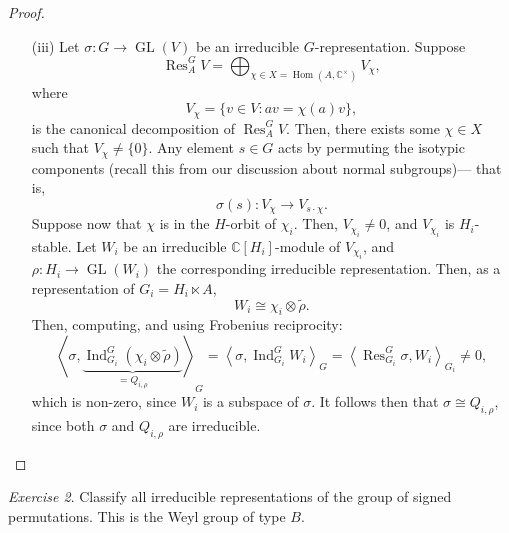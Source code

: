 \documentclass[a4paper]{report}
\theoremstyle{definition}
\theoremstyle{remark}
\theoremstyle{proposition}
\theoremstyle{conjecture}
\theoremstyle{lemma}
\theoremstyle{corollary}
\theoremstyle{exercise}
\newtheorem{exercise}{Exercise}
\theoremstyle{example}
\newcommand{\C}{\mathbb{C}}
\newcommand{\on}{\operatorname}
\begin{document}
\begin{proof}
\begin{itemize}
$${        $a\in A$}\rbrace.$$
        We claim that $V_i$ is $H_i$-stable. Indeed,
        $$Q_{i,\rho}(a)h_i\cdot v = Q_{i,\rho}(a)\theta_{i,\rho}(h_i)v = Q_{i,\rho}(h_i) \theta_{i,\rho}(h_i^{-1}ah_i)v = Q_{i,\rho}(h_i) \underbrace{\chi_i(h_i^{-1}ah_i)}_{=h_i\cdot \chi_i(a) =\chi_i(a)}v = \chi_i(a) h_iv.$$
        It follows then that $V_i \cong \rho$ as $H_i$-representations,
        and it thus follows that $Q_{i,\rho}$ determines $\rho$ --- 
        this is because $\chi_i\otimes \widetilde{\rho} \cong V_i$ as 
        $H_i$-representations.
        \begin{exercise}
            Prove this isomorphism.
        \end{exercise}
        \begin{proof}

        \end{proof}
    \item[(iii)] Let $\sigma : G \to \on{GL}(V)$ be an irreducible 
        $G$-representation. Suppose 
        $$\on{Res}^G_A V = \bigoplus_{\chi \in X = \on{Hom}(A,\C^\times)}V_\chi,$$
        where $$V_\chi = \lbrace v\in V : av = \chi(a) v\rbrace,$$
        is the canonical decomposition of $\on{Res}^G_AV$.
        Then, there exists some $\chi \in X$ such that 
        $V_\chi \neq \lbrace0\rbrace$. Any element $s\in G$ acts 
        by permuting the isotypic components (recall this from our discussion 
        about normal subgroups)--- that is,
        $$\sigma(s) : V_\chi \longrightarrow V_{s\cdot \chi}.$$
        Suppose now that $\chi$ is in the $H$-orbit of $\chi_i$.
        Then, $V_{\chi_i}\neq 0$, and $V_{\chi_i}$ is $H_i$-stable.
        Let $W_i$ be an irreducible $\C[H_i]$-module of $V_{\chi_i}$,
        and $\rho : H_i \to \on{GL}(W_i)$ the corresponding 
        irreducible representation. Then, as a representation of 
        $G_i = H_i\ltimes A$, $$W_i \cong \chi_i\otimes \widetilde{\rho}.$$
        Then, computing, and using Frobenius reciprocity:
        $$\left\langle \sigma, \underbrace{\on{Ind}_{G_i}^G (\chi_i\otimes\widetilde{\rho})}_{=Q_{i,\rho}}\right\rangle_G = \left\langle \sigma, \on{Ind}_{G_i}^GW_i\right\rangle_G = \left\langle \on{Res}_{G_i}^G \sigma, W_i\right\rangle_{G_i} \neq 0,$$
        which is non-zero, since $W_i$ is a subspace of $\sigma$.
        It follows then that $\sigma \cong Q_{i,\rho}$, since 
        both $\sigma$ and $Q_{i,\rho}$ are irreducible.
    \end{itemize}
\end{proof}

\begin{exercise}
    Classify all irreducible representations of the group of signed permutations.
    This is the Weyl group of type $B$.
\end{exercise}
\end{document}
